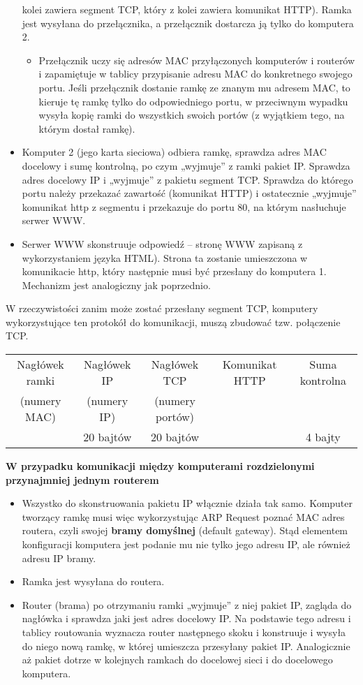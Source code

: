 \documentclass[a4paper]{article}
\begin{document}
\begin{itemize}
    kolei zawiera segment TCP, który z kolei zawiera komunikat HTTP). Ramka	jest wysyłana do przełącznika, a przełącznik dostarcza ją tylko	do komputera 2.
    \begin{itemize}
        \item Przełącznik uczy się adresów MAC przyłączonych komputerów i routerów i zapamiętuje w tablicy przypisanie adresu MAC do konkretnego swojego portu. Jeśli przełącznik dostanie ramkę ze znanym mu	 adresem MAC, to kieruje tę ramkę tylko do odpowiedniego portu, w przeciwnym wypadku wysyła kopię ramki do wszystkich swoich portów (z	wyjątkiem tego, na którym	dostał ramkę).
    \end{itemize}
    \item Komputer 2 (jego karta sieciowa) odbiera ramkę, sprawdza adres MAC docelowy i sumę kontrolną, po czym „wyjmuje” z ramki pakiet IP. Sprawdza adres docelowy IP i „wyjmuje”	z pakietu segment TCP. Sprawdza do którego portu należy przekazać zawartość (komunikat HTTP) i ostatecznie „wyjmuje” komunikat http z segmentu i przekazuje do portu 80, na którym nasłuchuje serwer WWW.
    \item Serwer WWW skonstruuje odpowiedź – stronę WWW zapisaną z wykorzystaniem języka HTML). Strona ta zostanie umieszczona w komunikacie http, który następnie musi być przesłany do komputera 1. Mechanizm jest analogiczny jak poprzednio.
\end{itemize}
W rzeczywistości zanim może zostać przesłany segment TCP, komputery wykorzystujące ten protokół do komunikacji, muszą zbudować tzw. połączenie TCP.


\begin{tabular}{|c|c|c|c|c|}
\hline
Nagłówek ramki & Nagłówek IP & Nagłówek TCP & Komunikat HTTP & Suma kontrolna\\
(numery MAC) & (numery IP) & (numery portów) & & \\
& 20 bajtów & 20 bajtów & & 4 bajty\\
\hline
\end{tabular}

\textbf{W przypadku komunikacji między komputerami rozdzielonymi przynajmniej jednym routerem}
\begin{itemize}
    \item Wszystko do skonstruowania pakietu IP włącznie działa tak samo. Komputer tworzący ramkę musi więc wykorzystując ARP Request poznać
    MAC adres routera, czyli swojej \textbf{bramy domyślnej} (default gateway). Stąd elementem konfiguracji komputera jest podanie mu nie tylko
    jego adresu IP, ale również adresu IP bramy.
    \item Ramka jest wysyłana do routera.
    \item Router (brama) po otrzymaniu ramki „wyjmuje” z niej pakiet IP, zagląda do nagłówka i sprawdza jaki jest adres docelowy IP. Na podstawie
    tego adresu i tablicy routowania wyznacza router następnego skoku i konstruuje i wysyła do niego nową ramkę, w której umieszcza przesyłany pakiet IP. Analogicznie aż pakiet dotrze w kolejnych ramkach do docelowej sieci i do docelowego komputera.
\end{itemize}
\end{document}
